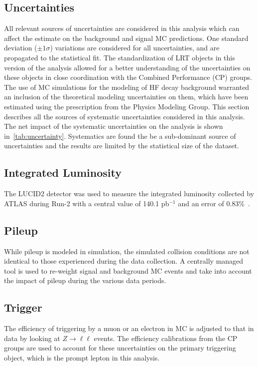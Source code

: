 \subsection{Uncertainties}
All relevant sources of uncertainties are considered in this analysis which can affect the estimate on the background and signal MC predictions. One standard deviation ($\pm 1 \sigma$) variations are considered for all uncertainties, and are propagated to the statistical fit. The standardization of LRT objects in this version of the analysis allowed for a better understanding of the uncertainties on these objects in close coordination with the Combined Performance (CP) groups. The use of MC simulations for the modeling of HF decay background warranted an inclusion of the theoretical modeling uncertainties on them, which have been estimated using the prescription from the Physics Modeling Group. This section describes all the sources of systematic uncertainties considered in this analysis. The net impact of the systematic uncertainties on the analysis is shown in~\cref{tab:uncertainty}. Systematics are found the be a sub-dominant source of uncertainties and the results are limited by the statistical size of the dataset.

\subsection*{Integrated Luminosity}
The LUCID2 detector was used to measure the integrated luminosity collected by ATLAS during Run-2 with a central value of 140.1 pb$^{-1}$ and an error of 0.83\%~\cite{DAPR-2021-01}.

\subsection*{Pileup}
While pileup is modeled in simulation, the simulated collision conditions are not identical to those experienced during the data collection. A centrally managed tool is used to re-weight signal and background MC events and take into account the impact of pileup during the various data periods.

\subsection*{Trigger}
The efficiency of triggering by a muon or an electron in MC is adjusted to that in data by looking at $Z\to\ell\ell$ events. The efficiency calibrations from the CP groups are used to account for these uncertainties on the primary triggering object, which is the prompt lepton in this analysis.

